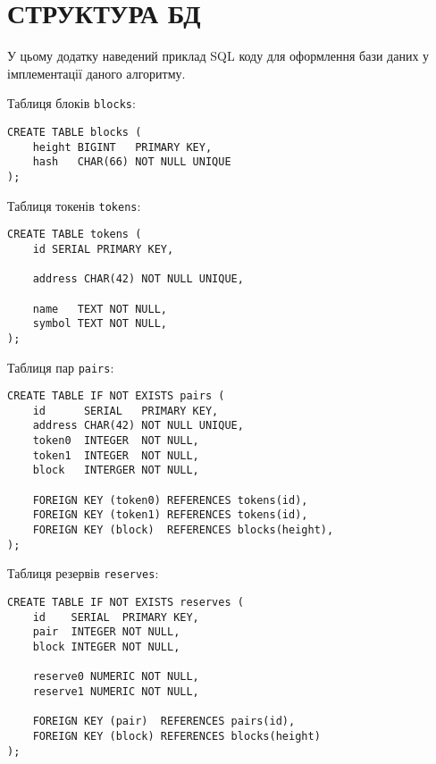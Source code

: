 \documentclass[14pt]{extarticle}
\begin{document}
\newpage

\printbibliography[title = ПЕРЕЛІК ДЖЕРЕЛ ПОСИЛАННЯ]{}
\newpage


\section*{СТРУКТУРА БД}\label{appendix:db}

У цьому додатку наведений приклад SQL коду для оформлення бази даних у
імплементації даного алгоритму.

Таблиця блоків \texttt{blocks}:

\begin{verbatim}
CREATE TABLE blocks (
    height BIGINT   PRIMARY KEY,
    hash   CHAR(66) NOT NULL UNIQUE
);
\end{verbatim}

Таблиця токенів \texttt{tokens}:

\begin{verbatim}
CREATE TABLE tokens (
    id SERIAL PRIMARY KEY,

    address CHAR(42) NOT NULL UNIQUE,

    name   TEXT NOT NULL,
    symbol TEXT NOT NULL,
);
\end{verbatim}

Таблиця пар \texttt{pairs}:

\begin{verbatim}
CREATE TABLE IF NOT EXISTS pairs (
    id      SERIAL   PRIMARY KEY,
    address CHAR(42) NOT NULL UNIQUE,
    token0  INTEGER  NOT NULL,
    token1  INTEGER  NOT NULL,
    block   INTERGER NOT NULL,

    FOREIGN KEY (token0) REFERENCES tokens(id),
    FOREIGN KEY (token1) REFERENCES tokens(id),
    FOREIGN KEY (block)  REFERENCES blocks(height),
);
\end{verbatim}

Таблиця резервів \texttt{reserves}:

\begin{verbatim}
CREATE TABLE IF NOT EXISTS reserves (
    id    SERIAL  PRIMARY KEY,
    pair  INTEGER NOT NULL,
    block INTEGER NOT NULL,

    reserve0 NUMERIC NOT NULL,
    reserve1 NUMERIC NOT NULL,

    FOREIGN KEY (pair)  REFERENCES pairs(id),
    FOREIGN KEY (block) REFERENCES blocks(height)
);
\end{verbatim}
\end{document}

